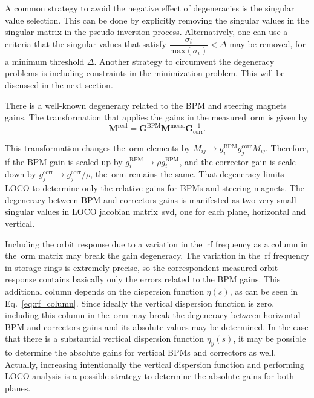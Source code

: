 A common strategy to avoid the negative effect of degeneracies is the singular value selection. This can be done by explicitly removing the singular values in the singular matrix in the pseudo-inversion process. Alternatively, one can use a criteria that the singular values that satisfy $\dfrac{\sigma_i}{\mathrm{max}\left(\sigma_i\right)} < \Delta$ may be removed, for a minimum threshold $\Delta$. Another strategy to circumvent the degeneracy problems is including constraints in the minimization problem. This will be discussed in the next section.

There is a well-known degeneracy related to the BPM and steering magnets gains. The transformation that applies the gains in the measured~\gls{orm} is given by 
\begin{equation}
    \mathbf{M}^{\mathrm{real}} = \mathbf{G}^{\mathrm{BPM}} \mathbf{M}^{\mathrm{meas.}}\mathbf{G}^{-1}_{\mathrm{corr}}.
\end{equation}

This transformation changes the~\gls{orm} elements by $M_{ij} \rightarrow g_{i}^{\mathrm{BPM}}g_{j}^{\mathrm{corr}}M_{ij}$. Therefore, if the BPM gain is scaled up by $g_{i}^{\mathrm{BPM}} \rightarrow \rho g_{i}^{\mathrm{BPM}}$, and the corrector gain is scale down by $g_{j}^{\mathrm{corr}} \rightarrow g_{j}^{\mathrm{corr}}/\rho$, the~\gls{orm} remains the same. That degeneracy limits LOCO to determine only the relative gains for BPMs and steering magnets. The degeneracy between BPM and correctors gains is manifested as two very small singular values in LOCO jacobian matrix~\gls{svd}, one for each plane, horizontal and vertical.

Including the orbit response due to a variation in the~\gls{rf} frequency as a column in the~\gls{orm} matrix may break the gain degeneracy. The variation in the~\gls{rf} frequency in storage rings is extremely precise, so the correspondent measured orbit response contains basically only the errors related to the BPM gains. This additional column depends on the dispersion function $\eta(s)$, as can be seen in Eq.~\eqref{eq:rf_column}. Since ideally the vertical dispersion function is zero, including this column in the~\gls{orm} may break the degeneracy between horizontal BPM and correctors gains and its absolute values may be determined. In the case that there is a substantial vertical dispersion function $\eta_y(s)$, it may be possible to determine the absolute gains for vertical BPMs and correctors as well. Actually, increasing intentionally the vertical dispersion function and performing LOCO analysis is a possible strategy to determine the absolute gains for both planes.
